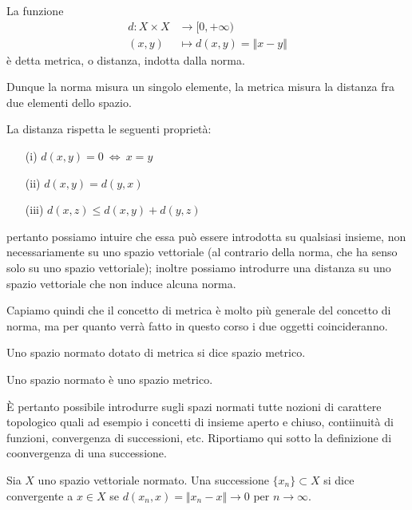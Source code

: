 \begin{defn}
[Metrica]
La funzione 
\begin{align*}
d: X\times X&\rightarrow [0, + \infty) \\
(x,y)&\mapsto d(x,y)=\Vert x-y\Vert
\end{align*}
è detta metrica, o distanza, indotta dalla norma.
\end{defn}
Dunque la norma misura un singolo elemente, la metrica misura la distanza fra due elementi dello spazio.

\begin{rem}
La distanza rispetta le seguenti proprietà:
\begin{enumerate}
    \item [(i)] $d(x,y)=0\ \Leftrightarrow\ x=y$
    \item [(ii)] $d(x,y)=d(y,x)$
    \item [(iii)] $d(x,z)\leq d(x,y)+d(y,z)$
\end{enumerate}
pertanto possiamo intuire che essa può essere introdotta su qualsiasi insieme, non necessariamente su uno spazio vettoriale (al contrario della norma, che ha senso solo su uno spazio vettoriale); inoltre possiamo introdurre una distanza su uno spazio vettoriale che non induce alcuna norma.

Capiamo quindi che il concetto di metrica è molto più generale del concetto di norma, ma per quanto verrà fatto in questo corso i due oggetti coincideranno.
\end{rem}

\begin{defn}
Uno spazio normato dotato di metrica si dice spazio metrico.
\end{defn}

\begin{thm}
Uno spazio normato è uno spazio metrico.
\end{thm}

È pertanto possibile introdurre sugli spazi normati tutte nozioni di carattere topologico quali ad esempio i concetti di insieme aperto e chiuso, contiinuità di funzioni, convergenza di successioni, etc. Riportiamo qui sotto la definizione di coonvergenza di una successione.

\begin{defn}
Sia $X$ uno spazio vettoriale normato. Una successione $\{x_n\}\subset X$ si dice convergente a $x\in X$ se $d(x_n,x)=\Vert x_n-x\Vert\to 0$ per $n\to\infty$.
\end{defn}

